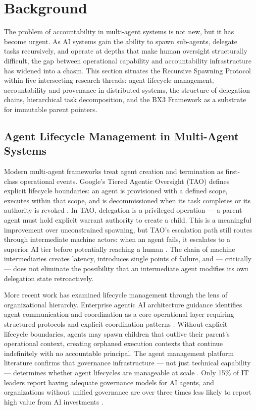 \section{Background}
\label{sec:background}

The problem of accountability in multi-agent systems is not new, but it has become urgent. As AI systems gain the ability to spawn sub-agents, delegate tasks recursively, and operate at depths that make human oversight structurally difficult, the gap between operational capability and accountability infrastructure has widened into a chasm. This section situates the Recursive Spawning Protocol within five intersecting research threads: agent lifecycle management, accountability and provenance in distributed systems, the structure of delegation chains, hierarchical task decomposition, and the BX3 Framework as a substrate for immutable parent pointers.

\subsection{Agent Lifecycle Management in Multi-Agent Systems}
\label{sec:lifecycle-management}

Modern multi-agent frameworks treat agent creation and termination as first-class operational events. Google's Tiered Agentic Oversight (TAO) defines explicit lifecycle boundaries: an agent is provisioned with a defined scope, executes within that scope, and is decommissioned when its task completes or its authority is revoked \cite{tao2025}. In TAO, delegation is a privileged operation — a parent agent must hold explicit warrant authority to create a child. This is a meaningful improvement over unconstrained spawning, but TAO's escalation path still routes through intermediate machine actors: when an agent fails, it escalates to a superior AI tier before potentially reaching a human \cite{tao2025}. The chain of machine intermediaries creates latency, introduces single points of failure, and — critically — does not eliminate the possibility that an intermediate agent modifies its own delegation state retroactively.

More recent work has examined lifecycle management through the lens of organizational hierarchy. Enterprise agentic AI architecture guidance identifies agent communication and coordination as a core operational layer requiring structured protocols and explicit coordination patterns \cite{enterprise2025}. Without explicit lifecycle boundaries, agents may spawn children that outlive their parent's operational context, creating orphaned execution contexts that continue indefinitely with no accountable principal. The agent management platform literature confirms that governance infrastructure — not just technical capability — determines whether agent lifecycles are manageable at scale \cite{kore2025}. Only 15\% of IT leaders report having adequate governance models for AI agents, and organizations without unified governance are over three times less likely to report high value from AI investments \cite{kore2025}.

